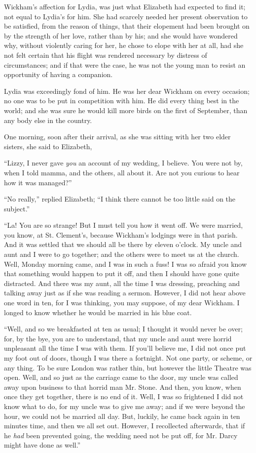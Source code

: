 Wickham’s affection for Lydia, was just what Elizabeth
had expected to find it; not equal to Lydia’s for him.
She had scarcely needed her present observation to be
satisfied, from the reason of things, that their elopement
had been brought on by the strength of her love, rather
than by his; and she would have wondered why, without
violently caring for her, he chose to elope with her at
all, had she not felt certain that his flight was rendered
necessary by distress of circumstances; and if that were
the case, he was not the young man to resist an opportunity
of having a companion.

Lydia was exceedingly fond of him. He was her dear
Wickham on every occasion; no one was to be put in
competition with him. He did every thing best in the
world; and she was sure he would kill more birds on the
first of September, than any body else in the country.

One morning, soon after their arrival, as she was sitting
with her two elder sisters, she said to Elizabeth,

“Lizzy, I never gave \textit{you} an account of my wedding,
I believe. You were not by, when I told mamma, and the
others, all about it. Are not you curious to hear how it
was managed?”

“No really,” replied Elizabeth; “I think there cannot
be too little said on the subject.”

“La! You are so strange! But I must tell you how
it went off. We were married, you know, at St. Clement’s,
because Wickham’s lodgings were in that parish. And
it was settled that we should all be there by eleven o’clock.
My uncle and aunt and I were to go together; and the
others were to meet us at the church. Well, Monday
morning came, and I was in such a fuss! I was so afraid
you know that something would happen to put it off, and
then I should have gone quite distracted. And there was
my aunt, all the time I was dressing, preaching and
talking away just as if she was reading a sermon. However,
I did not hear above one word in ten, for I was
thinking, you may suppose, of my dear Wickham. I longed
to know whether he would be married in his blue coat.

“Well, and so we breakfasted at ten as usual; I
thought it would never be over; for, by the bye, you are
to understand, that my uncle and aunt were horrid
unpleasant all the time I was with them. If you’ll believe
me, I did not once put my foot out of doors, though I was
there a fortnight. Not one party, or scheme, or any thing.
To be sure London was rather thin, but however the
little Theatre was open. Well, and so just as the carriage
came to the door, my uncle was called away upon business
to that horrid man Mr. Stone. And then, you know,
when once they get together, there is no end of it. Well,
I was so frightened I did not know what to do, for my
uncle was to give me away; and if we were beyond the
hour, we could not be married all day. But, luckily, he
came back again in ten minutes time, and then we all
set out. However, I recollected afterwards, that if he
\textit{had} been prevented going, the wedding need not be put
off, for Mr. Darcy might have done as well.”

